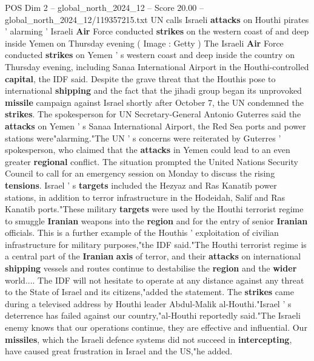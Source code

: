 \begin{textsample}{POS Dim 2 – global\_north\_2024\_12 – Score 20.00 – global\_north\_2024\_12/119357215.txt}  \label{ex:f2_pos_276}
UN calls Israeli \textbf{attacks} on Houthi pirates ' alarming ' Israeli \textbf{Air} Force conducted \textbf{strikes} on the western coast of and deep inside Yemen on Thursday evening ( Image : Getty ) The Israeli \textbf{Air} Force conducted \textbf{strikes} on Yemen ' s western coast and deep inside the country on Thursday evening, including Sanaa International Airport in the Houthi-controlled \textbf{capital}, the IDF said.
Despite the grave threat that the Houthis pose to international \textbf{shipping} and the fact that the jihadi group began its unprovoked \textbf{missile} campaign against Israel shortly after October 7, the UN condemned the \textbf{strikes}.
The spokesperson for UN Secretary-General Antonio Guterres said the \textbf{attacks} on Yemen ' s Sanaa International Airport, the Red Sea ports and power stations were"alarming."The UN ' s concerns were reiterated by Guterres ' spokesperson, who claimed that the \textbf{attacks} in Yemen could lead to an even greater \textbf{regional} conflict.
The situation prompted the United Nations Security Council to call for an emergency session on Monday to discuss the rising \textbf{tensions}.
Israel ' s \textbf{targets} included the Hezyaz and Ras Kanatib power stations, in addition to terror infrastructure in the Hodeidah, Salif and Ras Kanatib ports."These military \textbf{targets} were used by the Houthi terrorist regime to smuggle \textbf{Iranian} weapons into the \textbf{region} and for the entry of senior \textbf{Iranian} officials.
This is a further example of the Houthis ' exploitation of civilian infrastructure for military purposes,"the IDF said."The Houthi terrorist regime is a central part of the \textbf{Iranian} \textbf{axis} of terror, and their \textbf{attacks} on international \textbf{shipping} vessels and routes continue to destabilise the \textbf{region} and the \textbf{wider} world....
The IDF will not hesitate to operate at any distance against any threat to the State of Israel and its citizens,"added the statement.
The \textbf{strikes} came during a televised address by Houthi leader Abdul-Malik al-Houthi."Israel ' s deterrence has failed against our country,"al-Houthi reportedly said."The Israeli enemy knows that our operations continue, they are effective and influential.
Our \textbf{missiles}, which the Israeli defence systems did not succeed in \textbf{intercepting}, have caused great frustration in Israel and the US,"he added.

\end{textsample}
